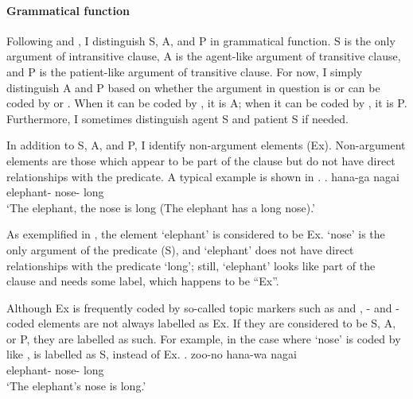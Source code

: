 \paragraph{Grammatical function}

Following  and ,
I distinguish S, A, and P in grammatical function.
S is the only argument of intransitive clause,
A is the agent-like argument of transitive clause,
and P is the patient-like argument of transitive clause.
For now, I simply distinguish A and P based on whether the argument in question is or can be coded by  or .
When it can be coded by , it is A;
when it can be coded by , it is P.
Furthermore, I sometimes distinguish agent S and patient S if needed.

In addition to S, A, and P,
I identify non-argument elements (Ex).\label{FW:Cor:TopFoc:ExDef}
Non-argument elements are those which appear to be part of the clause but do not have direct relationships with the predicate.
A typical example is shown in \Next.
%
\exg.  hana-ga nagai \\
		elephant- nose- long \\
		`The elephant, the nose is long (The elephant has a long nose).' \hfill{\cite{mikami60}}

As exemplified in \Last,
the element  `elephant' is considered to be Ex.
 `nose' is the only argument of the predicate (S),
and  `elephant' does not have direct relationships with the predicate  `long';
still,  `elephant' looks like part of the clause and needs some label,
which happens to be ``Ex''.

Although Ex is frequently coded by so-called topic markers
such as  and ,
- and -coded elements are not always labelled as Ex.
If they are considered to be S, A, or P,
they are labelled as such.
For example, in the case where  `nose' is coded by  like \Next,
 is labelled as S, instead of Ex.
%
\exg. zoo-no hana-wa nagai \\
      elephant- nose- long \\
      `The elephant's nose is long.'







